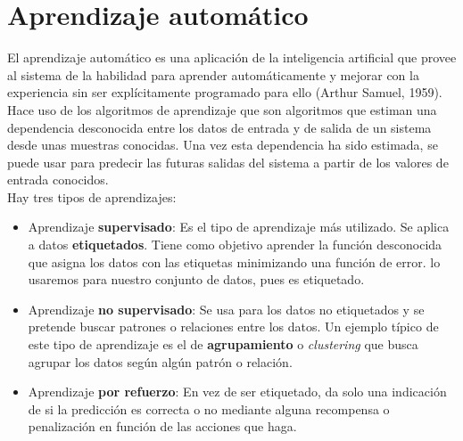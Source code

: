 
\chapter{Aprendizaje automático}\label{ch:machine-learning}
El aprendizaje automático es una aplicación de la inteligencia artificial que provee al sistema de la habilidad para aprender automáticamente y mejorar con la experiencia sin ser explícitamente programado para ello (Arthur Samuel, 1959). Hace uso de los algoritmos de aprendizaje que son algoritmos que estiman una dependencia desconocida entre los datos de entrada y de salida de un sistema desde unas muestras conocidas. Una vez esta dependencia ha sido estimada, se puede usar para predecir las futuras salidas del sistema a partir de los valores de entrada conocidos.\\
Hay tres tipos de aprendizajes:
\begin{itemize}
  \item Aprendizaje \textbf{supervisado}: Es el tipo de aprendizaje más utilizado. Se aplica a datos \textbf{etiquetados}. Tiene como objetivo aprender la función desconocida que asigna los datos con las etiquetas minimizando una función de error. lo usaremos para nuestro conjunto de datos, pues es etiquetado.
  \item Aprendizaje \textbf{no supervisado}: Se usa para los datos no etiquetados y se pretende buscar patrones o relaciones entre los datos. Un ejemplo típico de este tipo de aprendizaje es el de \textbf{agrupamiento} o \textit{clustering} que busca agrupar los datos según algún patrón o relación.
  \item Aprendizaje \textbf{por refuerzo}: En vez de ser etiquetado, da solo una indicación de si la predicción es correcta o no mediante alguna recompensa o penalización en función de las acciones que haga.
\end{itemize}
\cite{jordan2015machine}\\
